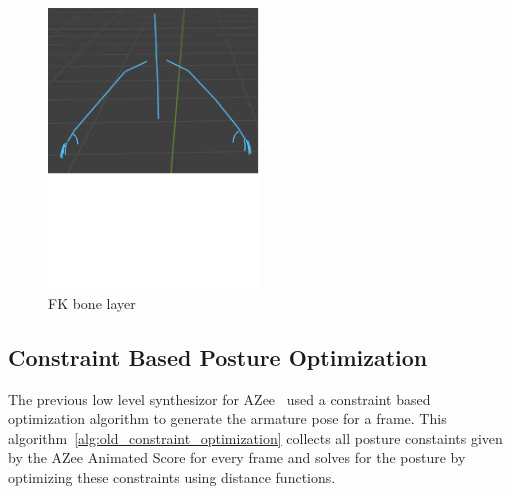 \documentclass[../../main.tex]{subfiles}
\begin{document}
\begin{figure}
    \centering
    \includegraphics[width=0.5\textwidth]{chapters/rigging_layers/images/fk_layer.png}
    \caption{FK bone layer}
    \label{fig:fk_layer}
\end{figure}

\subsection{Constraint Based Posture Optimization}
\label{ch:rigging_layers:proc_rig_signing_avatars:cb_posegen}

The previous low level synthesizor for AZee~\cite{fabrizio} used a constraint based optimization algorithm to generate the armature pose for a frame. This algorithm~\ref{alg:old_constraint_optimization} collects all posture constaints given by the AZee Animated Score for every frame and solves for the posture by optimizing these constraints using distance functions. 
\end{document}

